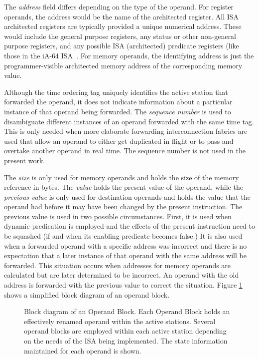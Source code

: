 \documentclass{book}
\begin{document}
The \textit{address} field differs
depending on the type of the operand.
For register operands, the address would be
the name of the architected register.
All ISA architected registers are typically provided a
unique numerical address.  These would include the
general purpose registers, any status or other non-general
purpose registers, and any possible ISA (architected) predicate registers
(like those in the iA-64 ISA~\cite{intel99ia,schlansker00epic}.
For memory operands, the identifying address is just the
programmer-visible architected memory address of the corresponding
memory value.

Although the time ordering tag uniquely identifies the active station
that forwarded the operand, it does not indicate information about
a particular instance of that operand being forwarded.
The \textit{sequence number} is used to disambiguate different
instances of an operand forwarded with the same time tag.
This is only needed when more elaborate forwarding interconnection fabrics
are used that allow an operand to either get duplicated in flight
or to pass and overtake another operand in real time.
The sequence number is not used in the present work.

The \textit{size} is only used for memory operands and holds
the size of the memory reference in bytes.
The \textit{value} holds the present value of the operand,
while the \textit{previous value} is only used for destination
operands and holds the value that the operand
had before it may have been changed by the present instruction.
The previous value is used in two possible circumstances.
First, it is used when dynamic predication is
employed and the effects of the present instruction need to be
squashed (if and when its enabling predicate becomes false.)
It is also used when a forwarded operand with a specific
address was incorrect 
and there is no expectation that a later instance
of that operand with the same address will be forwarded.
This situation occurs when addresses for memory operands are
calculated but are later determined to be incorrect.
An operand with the old address is forwarded with the previous
value to correct the situation.
Figure \ref{fig:operand} shows a simplified block diagram of
an operand block.
%
%
\begin{figure}
\centerline{}
\caption[Block diagram of an Operand Block]
{{Block diagram of an Operand Block.}
Each Operand Block holds an effectively renamed 
operand within the active stations.
Several operand blocks are employed within each active station
depending on the needs of the ISA being implemented.
The state information maintained for each operand
is shown.}
\label{fig:operand}
\end{figure}
%
%
\end{document}
